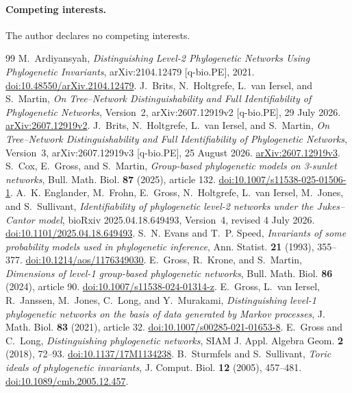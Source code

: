 \documentclass[11pt]{article}
\theoremstyle{remark}\newtheorem{remark}[theorem]{Remark}
\begin{document}
\paragraph{Competing interests.}
The author declares no competing interests.

\begin{thebibliography}{99}
M.~Ardiyansyah, \emph{Distinguishing Level-2 Phylogenetic Networks Using Phylogenetic Invariants}, arXiv:2104.12479 [q-bio.PE], 2021. \href{https://doi.org/10.48550/arXiv.2104.12479}{doi:10.48550/arXiv.2104.12479}.
J.~Brits, N.~Holtgrefe, L.~van Iersel, and S.~Martin, \emph{On Tree--Network Distinguishability and Full Identifiability of Phylogenetic Networks}, Version~2, arXiv:2607.12919v2 [q-bio.PE], 29 July 2026. \href{https://arxiv.org/abs/2607.12919v2}{arXiv:2607.12919v2}.
J.~Brits, N.~Holtgrefe, L.~van Iersel, and S.~Martin, \emph{On Tree--Network Distinguishability and Full Identifiability of Phylogenetic Networks}, Version~3, arXiv:2607.12919v3 [q-bio.PE], 25 August 2026. \href{https://arxiv.org/abs/2607.12919v3}{arXiv:2607.12919v3}.
S.~Cox, E.~Gross, and S.~Martin, \emph{Group-based phylogenetic models on 3-sunlet networks}, Bull. Math. Biol. \textbf{87} (2025), article 132. \href{https://doi.org/10.1007/s11538-025-01506-1}{doi:10.1007/s11538-025-01506-1}.
A.~K. Englander, M.~Frohn, E.~Gross, N.~Holtgrefe, L.~van Iersel, M.~Jones, and S.~Sullivant, \emph{Identifiability of phylogenetic level-2 networks under the Jukes--Cantor model}, bioRxiv 2025.04.18.649493, Version~4, revised 4 July 2026. \href{https://doi.org/10.1101/2025.04.18.649493}{doi:10.1101/2025.04.18.649493}.
S.~N. Evans and T.~P. Speed, \emph{Invariants of some probability models used in phylogenetic inference}, Ann. Statist. \textbf{21} (1993), 355--377. \href{https://doi.org/10.1214/aos/1176349030}{doi:10.1214/aos/1176349030}.
E.~Gross, R.~Krone, and S.~Martin, \emph{Dimensions of level-1 group-based phylogenetic networks}, Bull. Math. Biol. \textbf{86} (2024), article 90. \href{https://doi.org/10.1007/s11538-024-01314-z}{doi:10.1007/s11538-024-01314-z}.
E.~Gross, L.~van Iersel, R.~Janssen, M.~Jones, C.~Long, and Y.~Murakami, \emph{Distinguishing level-1 phylogenetic networks on the basis of data generated by Markov processes}, J. Math. Biol. \textbf{83} (2021), article 32. \href{https://doi.org/10.1007/s00285-021-01653-8}{doi:10.1007/s00285-021-01653-8}.
E.~Gross and C.~Long, \emph{Distinguishing phylogenetic networks}, SIAM J. Appl. Algebra Geom. \textbf{2} (2018), 72--93. \href{https://doi.org/10.1137/17M1134238}{doi:10.1137/17M1134238}.
B.~Sturmfels and S.~Sullivant, \emph{Toric ideals of phylogenetic invariants}, J. Comput. Biol. \textbf{12} (2005), 457--481. \href{https://doi.org/10.1089/cmb.2005.12.457}{doi:10.1089/cmb.2005.12.457}.
\end{thebibliography}
\end{document}
